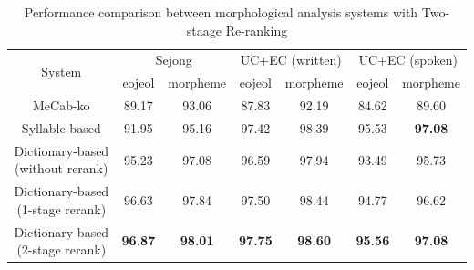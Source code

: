 \documentclass[AMS,STIX2COL]{WileyNJD-v2}
\begin{document}
    \begin{table}[]
        \caption{Performance comparison between morphological analysis systems with Two-staage Re-ranking}\label{tab:performance-with-reranking}
        \begin{tabular*}{500pt}{@{\extracolsep\fill}c|cccccc@{\extracolsep\fill}}
            \toprule
            \multirow{2}{*}{System} & \multicolumn{2}{c}{Sejong} & \multicolumn{2}{c}{UC+EC (written)} & \multicolumn{2}{c}{UC+EC (spoken)} \\
            \cmidrule{2-3} \cmidrule{4-5} \cmidrule{6-7}
            & \multicolumn{1}{c}{eojeol} & \multicolumn{1}{c}{morpheme} & \multicolumn{1}{c}{eojeol} & \multicolumn{1}{c}{morpheme} & \multicolumn{1}{c}{eojeol} & \multicolumn{1}{c}{morpheme} \\
            \midrule
            \hspace{2mm}MeCab-ko                          & 89.17                      & 93.06                        & 87.83                      & 92.19                        & 84.62                      & 89.60                        \\
            \hspace{2mm}Syllable-based                    & 91.95                      & 95.16                        & 97.42                      & 98.39                        & 95.53                      & \textbf{97.08}               \\
            \hspace{2mm}Dictionary-based (without rerank) & 95.23                      & 97.08                        & 96.59                      & 97.94                        & 93.49                      & 95.73                        \\
            \hspace{2mm}Dictionary-based (1-stage rerank) & 96.63                      & 97.84                        & 97.50                      & 98.44                        & 94.77                      & 96.62                        \\
            \hspace{2mm}Dictionary-based (2-stage rerank) & \textbf{96.87}             & \textbf{98.01}               & \textbf{97.75}             & \textbf{98.60}               & \textbf{95.56}             & \textbf{97.08}               \\
            \bottomrule
        \end{tabular*}
    \end{table}
\end{document}
